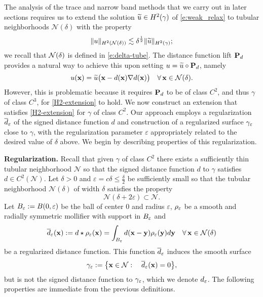 The analysis of the trace and narrow band methods that we carry out in later sections requires us to extend the solution $\widetilde{u}\in H^2(\gamma)$
of \eqref{e:weak_relax} to tubular neighborhoods 
$
\mathcal N(\delta)
$
with the property
%
\begin{equation}\label{H2-extension}
\|u\|_{H^2({\mathcal N(\delta)})} \lesssim \delta^{\frac12} \|\widetilde{u}\|_{H^2(\gamma)};
\end{equation}
%
we recall that ${\mathcal{N}(\delta)}$ is defined in \eqref{e:delta-tube}.
The distance function lift ${\bf P}_d$ provides a natural way to achieve this upon
setting $u=\widetilde{u}\circ{\bf P}_d$, namely
%
\[
u({\bf x}) = \widetilde{u} \big({\bf x} - d({\bf x}) \nabla d({\bf x}) \big)
\quad\forall \, {\bf x}\in{\mathcal N(\delta)}.
\]
%
However, this is problematic because it requires ${\bf P}_d$ to be of class $C^2$,
and thus $\gamma$ of
class $C^3$, for \eqref{H2-extension} to hold. We now construct an extension 
that satisfies \eqref{H2-extension} for $\gamma$ of class $C^2$.   Our approach employs a regularization $\overline{d}_\varepsilon$ of the signed distance function $d$ and construction of a regularized surface ${\gamma_\varepsilon}$ close to $\gamma$, with the regularization parameter $\varepsilon$ appropriately related to the desired value of $\delta$ above.  We begin by describing properties of this regularization.  

\medskip\noindent
{\bf Regularization.}
Recall that given $\gamma$ of class $C^{2}$ there exists a sufficiently thin tubular
neighborhood $\mathcal{N}$ so that the signed distance
function $d$ to $\gamma$ satisfies $d \in C^2(\mathcal{N})$.
Let $\delta>0$ and $\varepsilon = c \delta \le \frac{\delta}{2}$ be sufficiently small so that the
tubular neighborhood $\mathcal{N}(\delta)$ of width $\delta$ satisfies the property
\[
\mathcal{N}(\delta+2\varepsilon) \subset  \mathcal{N}.
\]
%
Let ${B_\varepsilon}:=B(0,\varepsilon)$ be the ball of center $0$ and radius $\varepsilon$, $\rho_\varepsilon$ be a smooth and radially symmetric mollifier with support in
${B_\varepsilon}$
and
%
\[
\overline{d}_\varepsilon({\bf x}) := d \star \rho_\varepsilon({\bf x}) = \int_{B_\varepsilon} d({\bf x}-{\bf y}) \rho_\varepsilon({\bf y}) d{\bf y}
\quad\forall \, {\bf x}\in{\mathcal N(\delta)}
\]
%
be a regularized distance function. This function $\overline{d}_\varepsilon$ induces the smooth
surface
%
\[
{\gamma_\varepsilon} := \big\{{\bf x}\in\mathcal{N}: \quad \overline{d}_\varepsilon({\bf x}) = 0 \big\},
\]
%
but is not the signed distance function to ${\gamma_\varepsilon}$, which we denote $d_\varepsilon$.
The following properties are immediate from the previous definitions.

